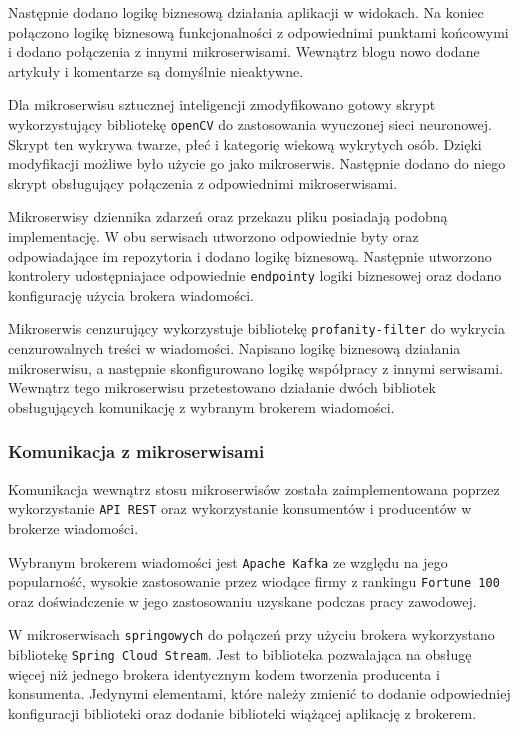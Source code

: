 \documentclass[12pt,twoside]{article}
\begin{document}
Następnie dodano logikę biznesową działania aplikacji w widokach. Na koniec połączono logikę biznesową funkcjonalności z odpowiednimi punktami końcowymi i dodano połączenia z innymi mikroserwisami. Wewnątrz blogu nowo dodane artykuły i komentarze są domyślnie nieaktywne.

Dla mikroserwisu sztucznej inteligencji zmodyfikowano gotowy skrypt wykorzystujący bibliotekę \texttt{openCV} do zastosowania wyuczonej sieci neuronowej. Skrypt ten wykrywa twarze, płeć i kategorię wiekową wykrytych osób. Dzięki modyfikacji możliwe było użycie go jako mikroserwis. Następnie dodano do niego skrypt obsługujący połączenia z odpowiednimi mikroserwisami\cite{lib}.

Mikroserwisy dziennika zdarzeń oraz przekazu pliku posiadają podobną implementację. W obu serwisach utworzono odpowiednie byty oraz odpowiadające im repozytoria i dodano logikę biznesową. Następnie utworzono kontrolery udostępniajace odpowiednie \texttt{endpointy} logiki biznesowej oraz dodano konfigurację użycia brokera wiadomości.

Mikroserwis cenzurujący wykorzystuje bibliotekę \texttt{profanity-filter}\cite{pf} do wykrycia cenzurowalnych treści w wiadomości. Napisano logikę biznesową działania mikroserwisu, a następnie skonfigurowano logikę współpracy z innymi serwisami. Wewnątrz tego mikroserwisu przetestowano działanie dwóch bibliotek obsługujących komunikację z wybranym brokerem wiadomości.

\subsubsection{Komunikacja z mikroserwisami}

Komunikacja wewnątrz stosu mikroserwisów została zaimplementowana poprzez wykorzystanie \texttt{API REST} oraz wykorzystanie konsumentów i producentów w brokerze wiadomości.

Wybranym brokerem wiadomości jest \texttt{Apache Kafka}\cite{kafka} ze względu na jego popularność, wysokie zastosowanie przez wiodące firmy z rankingu \texttt{Fortune 100} oraz doświadczenie w jego zastosowaniu uzyskane podczas pracy zawodowej.

W mikroserwisach \texttt{springowych} do połączeń przy użyciu brokera wykorzystano bibliotekę \texttt{Spring Cloud Stream}. Jest to biblioteka pozwalająca na obsługę więcej niż jednego brokera identycznym kodem tworzenia producenta i konsumenta. Jedynymi elementami, które należy zmienić to dodanie odpowiedniej konfiguracji biblioteki oraz dodanie biblioteki wiążącej aplikację z brokerem.
\end{document}
